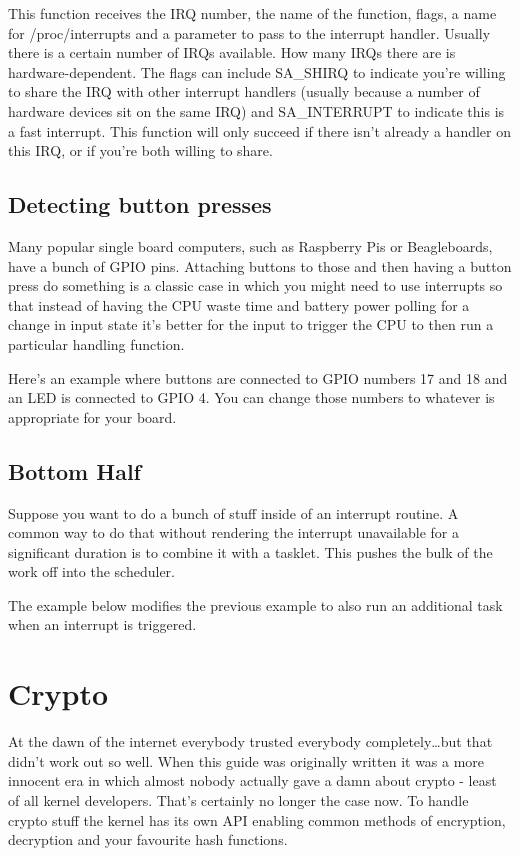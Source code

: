 \documentclass[10pt, oneside]{book}
\begin{document}
This function receives the IRQ number, the name of the function, flags, a name for /proc/interrupts and a parameter to pass to the interrupt handler. Usually there is a certain number of IRQs available. How many IRQs there are is hardware-dependent. The flags can include SA\_SHIRQ to indicate you're willing to share the IRQ with other interrupt handlers (usually because a number of hardware devices sit on the same IRQ) and SA\_INTERRUPT to indicate this is a fast interrupt. This function will only succeed if there isn't already a handler on this IRQ, or if you're both willing to share.

\subsection{Detecting button presses}
\label{sec:org683a7aa}
Many popular single board computers, such as Raspberry Pis or Beagleboards, have a bunch of GPIO pins. Attaching buttons to those and then having a button press do something is a classic case in which you might need to use interrupts so that instead of having the CPU waste time and battery power polling for a change in input state it's better for the input to trigger the CPU to then run a particular handling function.

Here's an example where buttons are connected to GPIO numbers 17 and 18 and an LED is connected to GPIO 4. You can change those numbers to whatever is appropriate for your board.


\subsection{Bottom Half}
\label{sec:orgf9f72ae}
Suppose you want to do a bunch of stuff inside of an interrupt routine. A common way to do that without rendering the interrupt unavailable for a significant duration is to combine it with a tasklet. This pushes the bulk of the work off into the scheduler.

The example below modifies the previous example to also run an additional task when an interrupt is triggered.


\section{Crypto}
\label{sec:orge418bf3}
At the dawn of the internet everybody trusted everybody completely\ldots{}but that didn't work out so well. When this guide was originally written it was a more innocent era in which almost nobody actually gave a damn about crypto - least of all kernel developers. That's certainly no longer the case now. To handle crypto stuff the kernel has its own API enabling common methods of encryption, decryption and your favourite hash functions.
\end{document}
